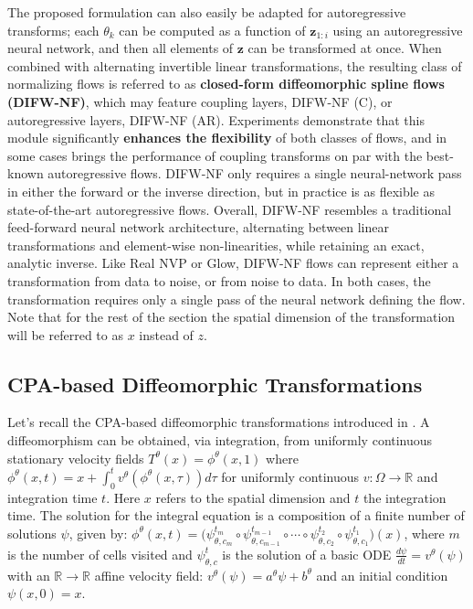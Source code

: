 The proposed formulation can also easily be adapted for autoregressive transforms; each $\theta_{k}$ can be computed as a function of $\mathbf{z}_{1:i}$ using an autoregressive neural network, and then all elements of $\mathbf{z}$ can be transformed at once. %
When combined with alternating invertible linear transformations, the resulting class of normalizing flows is referred to as \textbf{closed-form diffeomorphic spline flows (DIFW-NF)}, which may feature coupling layers, DIFW-NF (C), or autoregressive layers, DIFW-NF (AR).
Experiments demonstrate that this module significantly \textbf{enhances the flexibility} of both classes of flows, and in some cases brings the performance of coupling transforms on par with the best-known autoregressive flows.
DIFW-NF only requires a single neural-network pass in either the forward or the inverse direction, but in practice is as flexible as state-of-the-art autoregressive flows.
Overall, DIFW-NF resembles a traditional feed-forward neural network architecture, alternating between linear transformations and element-wise non-linearities, while retaining an exact, analytic inverse.
Like Real NVP or Glow, DIFW-NF flows can represent either a transformation from data to noise, or from noise to data. In both cases, the transformation requires only a single pass of the neural network defining the flow.
Note that for the rest of the section the spatial dimension of the transformation will be referred to as $x$ instead of $z$.


\subsection{CPA-based Diffeomorphic Transformations}

Let's recall the CPA-based diffeomorphic transformations introduced in \cite{martinez2022closed}. A diffeomorphism can be obtained, via integration, from uniformly continuous stationary velocity fields $T^{\theta}(x) = \phi^{\theta}(x,1)$ 
where $\phi^{\theta}(x,t) = x + \int_0^t v^{\theta}(\phi^{\theta}(x,\tau)) d\tau$ for uniformly continuous $v: \Omega \rightarrow \mathbb{R}$ and integration time $t$. 
Here $x$ refers to the spatial dimension and $t$ the integration time.
The solution for the integral equation is a composition of a finite number of solutions $\psi$, given by: $\phi^\theta(x,t) = \big(\psi_{\theta,c_m}^{t_m} \circ \psi_{\theta,c_{m-1}}^{t_{m-1}} \circ \cdots \circ \psi_{\theta,c_2}^{t_2} \circ \psi_{\theta,c_1}^{t_1} \big)(x)$, 
where $m$ is the number of cells visited and $\psi_{\theta,c}^{t}$ is the solution of a basic ODE $\frac{d\psi}{dt}=v^\theta(\psi)$
with an $\mathbb{R} \rightarrow \mathbb{R}$ affine velocity field: 
$v^\theta(\psi) = a^\theta \psi + b^\theta$ and an initial condition $\psi(x,0) = x$.

